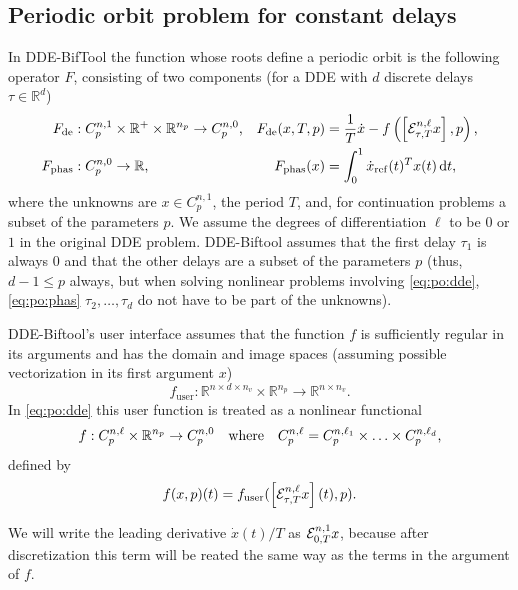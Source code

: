 \documentclass[11pt]{scrartcl}
\renewcommand{\d}{\mathop{}\!\mathrm{d}}
\newcommand{\R}{\mathbb{R}}
\begin{document}
\subsection{Periodic orbit problem for constant
  delays}\label{sec:const:var} In DDE-BifTool the
function whose roots define a periodic orbit is the following operator
$F$, consisting of two components (for a DDE with $d$ discrete
delays $\tau\in\R^{d}$)
\begin{align}
  \label{eq:po:dde}
  F_\mathrm{de}&:C^{n,1}_p\times\R^+\times\R^{n_p}\to C^{n,0}_p\mbox{,}&
  F_\mathrm{de}(x,T,p)&=\frac{1}{T}\dot x-
  f\left(\left[{\cal E}^{n,\ell}_{\tau,T}x\right],p\right)\mbox{,}\\
  \label{eq:po:phas}
  F_\mathrm{phas}&:C^{n,0}_p\to\R\mbox{,}&
  F_\mathrm{phas}(x)&=\int_0^1\dot x_\mathrm{ref}(t)^Tx(t)\d t\mbox{,}
\end{align}
where the unknowns are $x\in C_p^{n,1}$, the period $T$, and, for
continuation problems a subset of the parameters $p$. We assume the
degrees of differentiation $\ell$ to be $0$ or $1$ in the
original DDE problem. DDE-Biftool assumes that the first delay
$\tau_1$ is always $0$ and that the other delays are a subset of the
parameters $p$ (thus, $d-1\leq p$ always, but when solving
nonlinear problems involving \eqref{eq:po:dde}, \eqref{eq:po:phas}
$\tau_2,\ldots,\tau_d$ do not have to be part of the unknowns).

DDE-Biftool's user interface assumes that the function $f$ is
sufficiently regular in its arguments and has the domain and image
spaces (assuming possible vectorization in its first argument $x$)
\begin{displaymath}
  f_\mathrm{user}:\R^{n\times d\times n_v}\times \R^{n_p}\to \R^{n\times n_v}\mbox{.}
\end{displaymath}
In \eqref{eq:po:dde} this user function is treated as a nonlinear
functional
\begin{displaymath}
  f:C^{n,\ell}_p\times \R^{n_p}\to C^{n,0}_p
  \mbox{\quad where\quad}
  C^{n,\ell}_p=C^{n,\ell_1}_p\times\ldots\times C^{n,\ell_d}_p\mbox{,}
\end{displaymath}
defined by
\begin{displaymath}
  f(x,p)(t)=f_\mathrm{user}(\left[{\cal E}^{n,\ell}_{\tau,T}x\right](t),p)\mbox{.}
\end{displaymath}

We will write the leading
derivative $\dot x(t)/T$ as ${\cal E}^{n,1}_{0,T}x$, because after
discretization this term will be reated the same way as the terms in
the argument of $f$.
\end{document}
